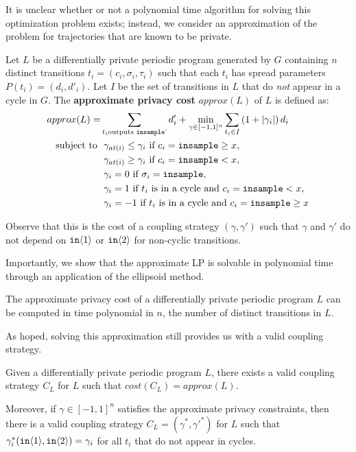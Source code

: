 It is unclear whether or not a polynomial time algorithm for solving this optimization problem exists; instead, we consider an approximation of the problem for trajectories that are known to be private. 

\begin{defn}
    Let $L$ be a differentially private periodic program generated by $G$ containing $n$ distinct transitions $t_i = (c_i, \sigma_i, \tau_i)$ such that each $t_i$ has spread parameters $P(t_i) = (d_i, d'_i)$.
    Let $I$ be the set of transitions in $L$ that do \textit{not} appear in a cycle in $G$. The \textbf{approximate privacy cost} $approx(L)$ of $L$ is defined as:
    \begin{align*} 
        approx(L) = &\sum_{t_i \text{outputs \texttt{insample}'}} d_i' + \min_{\gamma \in [-1, 1]^n} \sum_{t_i \in I} \left(1 + |\gamma_i| \right) d_i  \\
            \text{subject to } 
            &\ \gamma_{at(i)} \leq \gamma_i \text{ if } c_i = \texttt{insample}\geq x, \\
            &\ \gamma_{at(i)} \geq \gamma_i \text{ if } c_i = \texttt{insample} < x, \\
            &\ \gamma_i = 0 \text{ if } \sigma_i = \texttt{insample}, \\
            &\ \gamma_i = 1 \text{ if } t_i \text{ is in a cycle and } c_i = \texttt{insample} < x,\\ 
            &\ \gamma_i = -1 \text{ if } t_i \text{ is in a cycle and } c_i = \texttt{insample}\geq x
    \end{align*}
\end{defn}
Observe that this is the cost of a coupling strategy $(\gamma, \gamma')$ such that $\gamma$ and $\gamma'$ do not depend on $\texttt{in}\langle1 \rangle$ or $\texttt{in}\langle2 \rangle$ for non-cyclic transitions. 

Importantly, we show that the approximate LP is solvable in polynomial time through an application of the ellipsoid method.

\begin{prop}\label{approximateSolutionPolyTimeProp}
    The approximate privacy cost of a differentially private periodic program $L$ can be computed in time polynomial in $n$, the number of distinct transitions in $L$.
\end{prop}

As hoped, solving this approximation still provides us with a valid coupling strategy.

\begin{prop}
    \label{prop:approx_exists}
    Given a differentially private periodic program $L$, there exists a valid coupling strategy $C_L$ for $L$ such that $cost(C_L) = approx(L)$.

    Moreover, if $\gamma \in [-1, 1]^n$ satisfies the approximate privacy constraints, then there is a valid coupling strategy $C_L = (\gamma^*, {\gamma'}^*)$ for $L$ such that $\gamma_i^*(\texttt{in}\langle1 \rangle, \texttt{in}\langle2 \rangle) = \gamma_i$ for all $t_i$ that do not appear in cycles. 
\end{prop}

